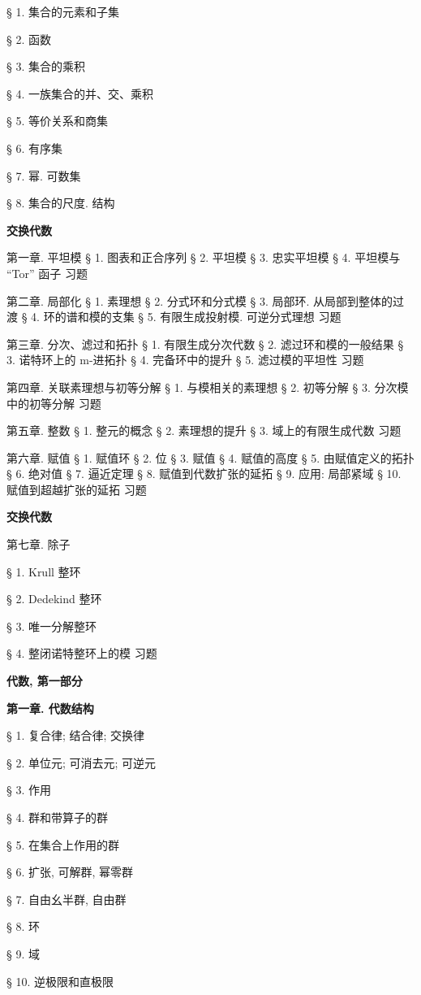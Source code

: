 § 1. 集合的元素和子集

§ 2. 函数

§ 3. 集合的乘积

§ 4. 一族集合的并、交、乘积

§ 5. 等价关系和商集

§ 6. 有序集

§ 7. 幂. 可数集

§ 8. 集合的尺度. 结构

\textbf{交换代数}

第一章. 平坦模 § 1. 图表和正合序列 § 2. 平坦模 § 3. 忠实平坦模 § 4. 平坦模与 ``Tor'' 函子 习题

第二章. 局部化 § 1. 素理想 § 2. 分式环和分式模 § 3. 局部环. 从局部到整体的过渡 § 4. 环的谱和模的支集 § 5. 有限生成投射模. 可逆分式理想 习题

第三章. 分次、滤过和拓扑 § 1. 有限生成分次代数 § 2. 滤过环和模的一般结果 § 3. 诺特环上的 m-进拓扑 § 4. 完备环中的提升 § 5. 滤过模的平坦性 习题

第四章. 关联素理想与初等分解 § 1. 与模相关的素理想 § 2. 初等分解 § 3. 分次模中的初等分解 习题

第五章. 整数 § 1. 整元的概念 § 2. 素理想的提升 § 3. 域上的有限生成代数 习题

第六章. 赋值 § 1. 赋值环 § 2. 位 § 3. 赋值 § 4. 赋值的高度 § 5. 由赋值定义的拓扑 § 6. 绝对值 § 7. 逼近定理 § 8. 赋值到代数扩张的延拓 § 9. 应用: 局部紧域 § 10. 赋值到超越扩张的延拓 习题

\textbf{交换代数}

第七章. 除子

§ 1. Krull 整环

§ 2. Dedekind 整环

§ 3. 唯一分解整环

§ 4. 整闭诺特整环上的模 习题

\textbf{代数, 第一部分}

\textbf{第一章. 代数结构}

§ 1. 复合律; 结合律; 交换律

§ 2. 单位元; 可消去元; 可逆元

§ 3. 作用

§ 4. 群和带算子的群

§ 5. 在集合上作用的群

§ 6. 扩张, 可解群, 幂零群

§ 7. 自由幺半群, 自由群

§ 8. 环

§ 9. 域

§ 10. 逆极限和直极限

